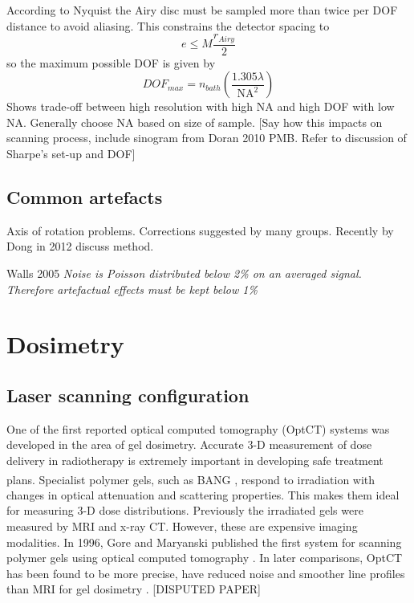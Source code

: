 \documentclass[12pt]{article}
\begin{document}
According to Nyquist the Airy disc must be sampled more than twice per DOF distance to avoid aliasing. This constrains the detector spacing to
\begin{equation}
e \leq M \dfrac{r_{Airy}}{2}
\end{equation}
so the maximum possible DOF is given by
\begin{equation}
DOF_{max} = n_{bath}(\dfrac{1.305\lambda}{\mathrm{NA}^{2}})
\end{equation}
Shows trade-off between high resolution with high NA and high DOF with low NA. Generally choose NA based on size of sample.
[Say how this impacts on scanning process, include sinogram from Doran 2010 PMB. Refer to discussion of Sharpe's set-up and DOF]

\subsection{Common artefacts}

Axis of rotation problems. Corrections suggested by many groups. Recently by Dong in 2012 \cite{Dong:2012}  discuss method.

Walls 2005 \textit{Noise is Poisson distributed below 2\% on an averaged signal. Therefore artefactual effects must be kept below 1\%}


\newpage
\section{Dosimetry}
\label{sec:dos}
\subsection{Laser scanning configuration}


One of the first reported optical computed tomography (OptCT) systems was developed in the area of gel dosimetry. Accurate 3-D measurement of dose delivery in radiotherapy is extremely important in developing safe treatment plans. Specialist polymer gels, such as BANG\textsuperscript{\textregistered} \cite{Maryanski:1996}, respond to irradiation with changes in optical attenuation and scattering properties.  This makes them ideal for measuring 3-D dose distributions. Previously the irradiated gels were measured by MRI and x-ray CT. However, these are expensive imaging modalities. In 1996, Gore and Maryanski published the first system for scanning polymer gels using optical computed tomography \cite{Gore:1999tg}. In later comparisons, OptCT has been found to be more precise, have reduced noise and smoother line profiles than MRI for gel dosimetry \cite{Oldham:2001gs}. [DISPUTED PAPER]
\end{document}
